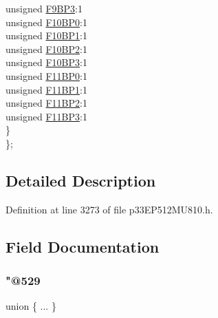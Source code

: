 \begin{DoxyCompactItemize}
\begin{tabbing}
\>\>unsigned \hyperlink{structtag_c1_b_u_f_p_n_t3_b_i_t_s_a7263710482a0ec8923783f6900197e3d}{F9BP3}:1\\
\>\>unsigned \hyperlink{structtag_c1_b_u_f_p_n_t3_b_i_t_s_a063827c62ae7b1104ae6c5a135e5c496}{F10BP0}:1\\
\>\>unsigned \hyperlink{structtag_c1_b_u_f_p_n_t3_b_i_t_s_aeb49de22ed31c89a213a27f73141f516}{F10BP1}:1\\
\>\>unsigned \hyperlink{structtag_c1_b_u_f_p_n_t3_b_i_t_s_a035c53d4cede2e18a3c96293e437e4fa}{F10BP2}:1\\
\>\>unsigned \hyperlink{structtag_c1_b_u_f_p_n_t3_b_i_t_s_af7d10a4c0fe7b2b130ca19aaf43c769b}{F10BP3}:1\\
\>\>unsigned \hyperlink{structtag_c1_b_u_f_p_n_t3_b_i_t_s_a291b6c32715595399cc6e695afb0582f}{F11BP0}:1\\
\>\>unsigned \hyperlink{structtag_c1_b_u_f_p_n_t3_b_i_t_s_a7df4fdc8d39685fc9ca45cb9206b96bb}{F11BP1}:1\\
\>\>unsigned \hyperlink{structtag_c1_b_u_f_p_n_t3_b_i_t_s_a769e690bd8cf4bbfde428e1d2dbbbc85}{F11BP2}:1\\
\>\>unsigned \hyperlink{structtag_c1_b_u_f_p_n_t3_b_i_t_s_ab0615a0c39198aa76f30ce5c5669dde7}{F11BP3}:1\\
\>\} \\
\}; \\

\end{tabbing}\end{DoxyCompactItemize}


\subsection{Detailed Description}


Definition at line 3273 of file p33\+E\+P512\+M\+U810.\+h.



\subsection{Field Documentation}
\mbox{\label{structtag_c1_b_u_f_p_n_t3_b_i_t_s_a9ce1ba863987605ff8040192f07a18cf}} 
\subsubsection{\texorpdfstring{"@529}{@529}}
{\footnotesize\ttfamily union \{ ... \} }

